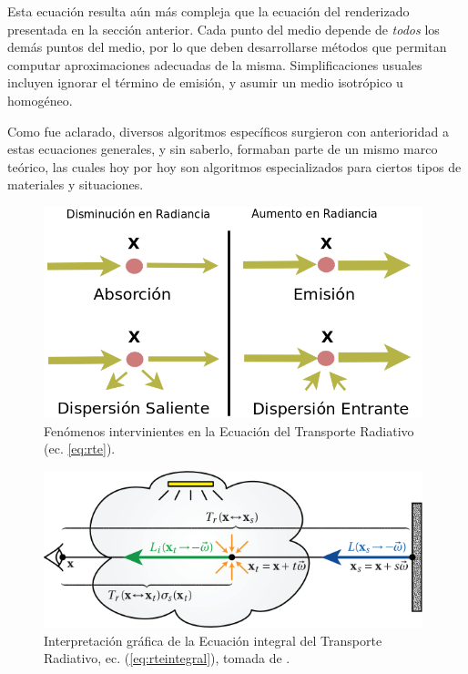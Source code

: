 Esta ecuación resulta aún más compleja que la ecuación del renderizado presentada en la sección anterior.
Cada punto del medio depende de {\em todos} los demás puntos del medio, por lo que deben desarrollarse métodos que permitan computar aproximaciones adecuadas de la misma.
Simplificaciones usuales incluyen ignorar el término de emisión, y asumir un medio isotrópico u homogéneo.

Como fue aclarado, diversos algoritmos específicos surgieron con anterioridad a estas ecuaciones generales, y sin saberlo, formaban parte de un mismo marco teórico, las cuales hoy por hoy son algoritmos especializados para ciertos tipos de materiales y situaciones.



\begin{figure}
\center
\includegraphics[width=11cm]{figures/fenomenosrte}
\caption[Fenómenos intervinientes en la Ecuación del Transporte Radiativo (ec. \ref{eq:rte})]{Fenómenos intervinientes en la Ecuación del Transporte Radiativo (ec. \ref{eq:rte}).}
\label{fg:fenomenosrte}
\end{figure}

\begin{figure}
\center
\includegraphics[width=11cm]{figures/rte}
\caption{Interpretación gráfica de la Ecuación integral del Transporte Radiativo, ec. (\ref{eq:rteintegral}), tomada de \cite{Jarosz2008}.}
\label{fg:rte}
\end{figure}


